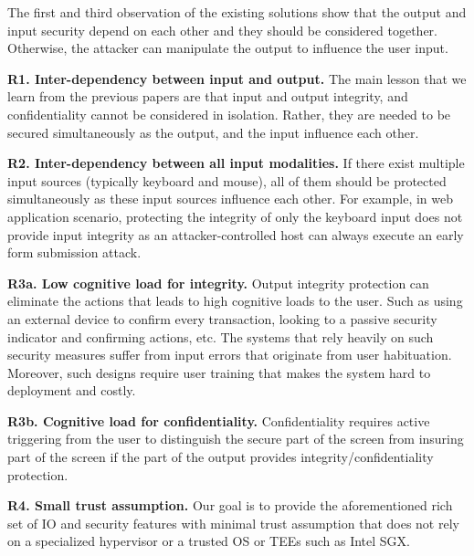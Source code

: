The first and third observation of the existing solutions show that the output and input security depend on each other and they should be considered together. Otherwise, the attacker can manipulate the output to influence the user input.

\begin{mylist}
  \item[] \textbf{R1. Inter-dependency between input and output.} The main lesson that we learn from the previous papers are that input and output integrity, and confidentiality cannot be considered in isolation. Rather, they are needed to be secured simultaneously as the output, and the input influence each other.  

  \item[] \textbf{R2. Inter-dependency between all input modalities.} If there exist multiple input sources (typically keyboard and mouse), all of them should be protected simultaneously as these input sources influence each other. For example, in web application scenario, protecting the integrity of only the keyboard input does not provide input integrity as an attacker-controlled host can always execute an early form submission attack.

  \item[] \textbf{R3a. Low cognitive load for integrity.} Output integrity protection can eliminate the actions that leads to high cognitive loads to the user.  Such as using an external device to confirm every transaction, looking to a passive security indicator and confirming actions, etc. The systems that rely heavily on such security measures suffer from input errors that originate from user habituation. Moreover, such designs require user training that makes the system hard to deployment and costly.

  \item[] \textbf{R3b. Cognitive load for confidentiality.} Confidentiality requires active triggering from the user to distinguish the secure part of the screen from insuring part of the screen if the part of the output provides integrity/confidentiality protection.

 
  \item[]  \textbf{R4. Small trust assumption.} Our goal is to provide the aforementioned rich set of IO and security features with minimal trust assumption that does not rely on a specialized hypervisor or a trusted OS  or TEEs such as Intel SGX. %

\end{mylist}
